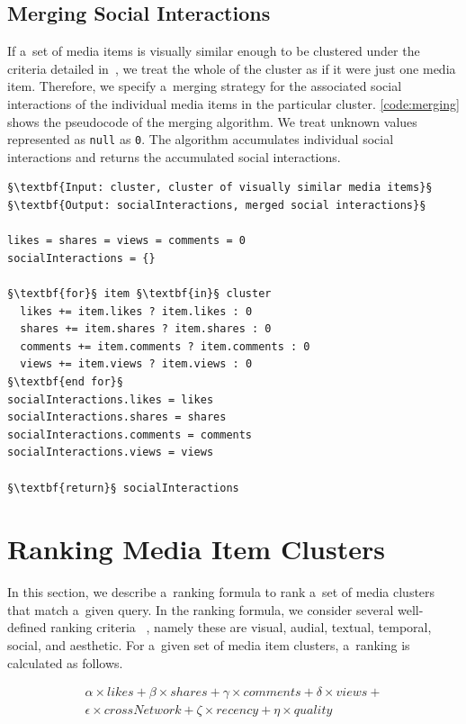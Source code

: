 \documentclass{sig-alternate}
\begin{document}
\subsection{Merging Social Interactions}
\label{sec:merging-social-interactions}

If a~set of media items is visually similar enough to be clustered
under the criteria detailed in~\cite{rizzo2012whatfresh},
we treat the whole of the cluster
as if it were just one media item.
Therefore, we specify a~merging strategy
for the associated social interactions of the individual media items
in the particular cluster.
\autoref{code:merging} shows the pseudocode of the merging algorithm.
We treat unknown values represented as \texttt{null} as \texttt{0}.
The algorithm accumulates individual social interactions
and returns the accumulated social interactions.

\begin{lstlisting}[caption=The social interactions merging algorithm,
  label=code:merging, float=b!]
§\textbf{Input: cluster, cluster of visually similar media items}§ 
§\textbf{Output: socialInteractions, merged social interactions}§ 

likes = shares = views = comments = 0
socialInteractions = {}

§\textbf{for}§ item §\textbf{in}§ cluster
  likes += item.likes ? item.likes : 0
  shares += item.shares ? item.shares : 0
  comments += item.comments ? item.comments : 0
  views += item.views ? item.views : 0
§\textbf{end for}§
socialInteractions.likes = likes
socialInteractions.shares = shares
socialInteractions.comments = comments
socialInteractions.views = views

§\textbf{return}§ socialInteractions
\end{lstlisting}

\section{Ranking Media Item Clusters}

In this section, we describe a~ranking formula to rank
a~set of media clusters that match a~given query.
In the ranking formula, we consider several well-defined ranking criteria~%
\cite{steiner2012definingaesthetic},
namely these are visual, audial, textual, temporal, social, and aesthetic.
For a~given set of media item clusters, a~ranking is calculated as follows.

\begin{gather}
  \alpha \times \mathit{likes} + \beta \times \mathit{shares} +
  \gamma \times \mathit{comments} + \delta \times \mathit{views} + \nonumber\\
  \epsilon \times \mathit{crossNetwork} + \zeta \times \mathit{recency} +
  \eta \times \mathit{quality}
\end{gather}
\end{document}
